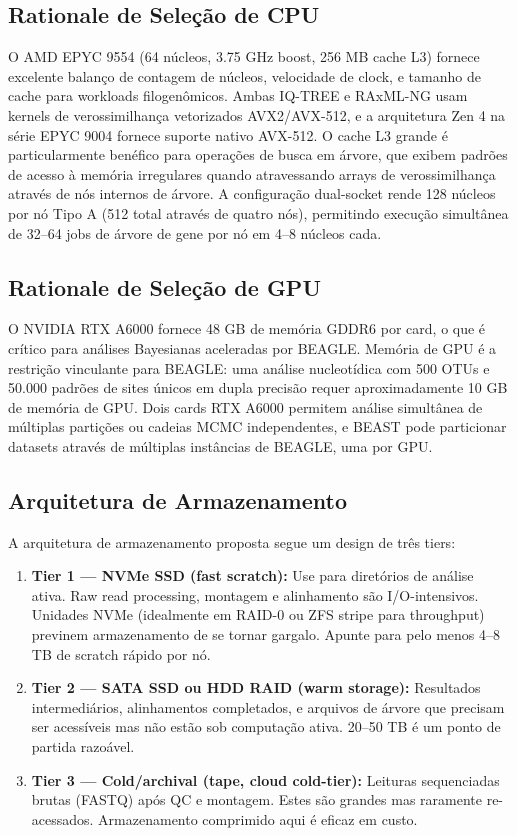 \subsection{Rationale de Seleção de CPU}

O AMD EPYC 9554 (64 núcleos, 3.75 GHz boost, 256 MB cache L3) fornece excelente balanço de contagem de núcleos, velocidade de clock, e tamanho de cache para workloads filogenômicos. Ambas IQ-TREE e RAxML-NG usam kernels de verossimilhança vetorizados AVX2/AVX-512, e a arquitetura Zen 4 na série EPYC 9004 fornece suporte nativo AVX-512. O cache L3 grande é particularmente benéfico para operações de busca em árvore, que exibem padrões de acesso à memória irregulares quando atravessando arrays de verossimilhança através de nós internos de árvore. A configuração dual-socket rende 128 núcleos por nó Tipo A (512 total através de quatro nós), permitindo execução simultânea de 32--64 jobs de árvore de gene por nó em 4--8 núcleos cada.

\subsection{Rationale de Seleção de GPU}

O NVIDIA RTX A6000 fornece 48 GB de memória GDDR6 por card, o que é crítico para análises Bayesianas aceleradas por BEAGLE. Memória de GPU é a restrição vinculante para BEAGLE: uma análise nucleotídica com 500 OTUs e 50.000 padrões de sites únicos em dupla precisão requer aproximadamente 10 GB de memória de GPU. Dois cards RTX A6000 permitem análise simultânea de múltiplas partições ou cadeias MCMC independentes, e BEAST pode particionar datasets através de múltiplas instâncias de BEAGLE, uma por GPU.

\subsection{Arquitetura de Armazenamento}

A arquitetura de armazenamento proposta segue um design de três tiers:

\begin{enumerate}
\item \textbf{Tier 1 --- NVMe SSD (fast scratch):} Use para diretórios de análise ativa. Raw read processing, montagem e alinhamento são I/O-intensivos. Unidades NVMe (idealmente em RAID-0 ou ZFS stripe para throughput) previnem armazenamento de se tornar gargalo. Apunte para pelo menos 4--8 TB de scratch rápido por nó.

\item \textbf{Tier 2 --- SATA SSD ou HDD RAID (warm storage):} Resultados intermediários, alinhamentos completados, e arquivos de árvore que precisam ser acessíveis mas não estão sob computação ativa. 20--50 TB é um ponto de partida razoável.

\item \textbf{Tier 3 --- Cold/archival (tape, cloud cold-tier):} Leituras sequenciadas brutas (FASTQ) após QC e montagem. Estes são grandes mas raramente re-acessados. Armazenamento comprimido aqui é eficaz em custo.
\end{enumerate}

